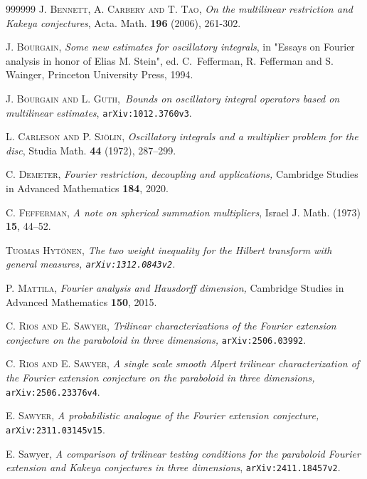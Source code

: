 \documentclass{amsart}%
\theoremstyle{plain}
\numberwithin{equation}{section}
\begin{document}
\begin{thebibliography}{999999}                                                                                           %
\textsc{J. Bennett, A. Carbery and T. Tao}, \textit{On
the multilinear restriction and Kakeya conjectures}, Acta. Math. \textbf{196}
(2006), 261-302.

\textsc{J. Bourgain,} \textit{Some new estimates for
oscillatory integrals}, in "Essays on Fourier analysis in honor of Elias M.
Stein", ed. C.\ Fefferman, R. Fefferman and S. Wainger, Princeton University
Press, 1994.

\textsc{J. Bourgain and L. Guth},\textit{\ Bounds on
oscillatory integral operators based on multilinear estimates},
\texttt{arXiv:1012.3760v3}.

\textsc{L. Carleson and P. Sj\"{o}lin,}
\textit{Oscillatory integrals and a multiplier problem for the disc}, Studia
Math. \textbf{44} (1972), 287--299.

\textsc{C. Demeter,} \textit{Fourier restriction, decoupling
and applications,} Cambridge Studies in Advanced Mathematics \textbf{184}, 2020.

\textsc{C. Fefferman, }\textit{A note on spherical summation
multipliers}, Israel J. Math. (1973) \textbf{15}, 44--52.

\textsc{Tuomas Hyt\"{o}nen, }\textit{The two weight
inequality for the Hilbert transform with general measures,
\texttt{arXiv:1312.0843v2}.}

\textsc{P. Mattila,} \textit{Fourier analysis and Hausdorff
dimension,} Cambridge Studies in Advanced Mathematics \textbf{150}, 2015.

\textsc{C. Rios and E. Sawyer,} \textit{Trilinear
characterizations of the Fourier extension conjecture on the paraboloid in
three dimensions, }\texttt{arXiv:2506.03992}.

\textsc{C. Rios and E. Sawyer,} \textit{A single scale
smooth Alpert trilinear characterization of the Fourier extension conjecture
on the paraboloid in three dimensions, }\texttt{arXiv:2506.23376v4}.

\textsc{E. Sawyer,} \textit{A probabilistic analogue of
the Fourier extension conjecture, }\texttt{arXiv:2311.03145v15}.

E. Sawyer, \textit{A comparison of trilinear testing
conditions for the paraboloid Fourier extension and Kakeya conjectures in
three dimensions}, \texttt{arXiv:2411.18457v2}.


\end{thebibliography}
\end{document}
